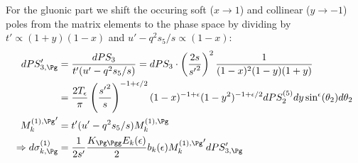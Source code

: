 For the gluonic part we shift the occuring soft ($x\rightarrow 1$) and collinear ($y\rightarrow -1$) poles from the matrix elements to the phase space by dividing by $t'\propto(1+y)(1-x)$ and $u'-q^2s_5/s\propto(1-x)$:
\begin{align}
dPS_{3,\Pg}' &= \frac{dPS_3}{t'(u'-q^2s_5/s)} = dPS_3 \cdot \left(\frac {2s}{{s'}^2}\right)^2\frac 1 {(1-x)^2(1-y)(1+y)}\\
 &= \frac {2T_\epsilon}{\pi} \left(\frac {{s'}^2} s\right)^{-1+\epsilon/2} (1-x)^{-1+\epsilon}(1-y^2)^{-1+\epsilon/2}dPS_2^{(5)}dy \sin^\epsilon(\theta_2)d\theta_2\\
{M_k^{(1),\Pg}}' &= t'(u'-q^2s_5/s)M_k^{(1),\Pg}\\
\Rightarrow d\sigma_{k,\Pg}^{(1)} &= \frac{1}{2s'}\frac {K_{\Pg\Pgg}E_k(\epsilon)} 2 b_k(\epsilon) {M_k^{(1),\Pg}}' dPS_{3,\Pg}'
\end{align}

